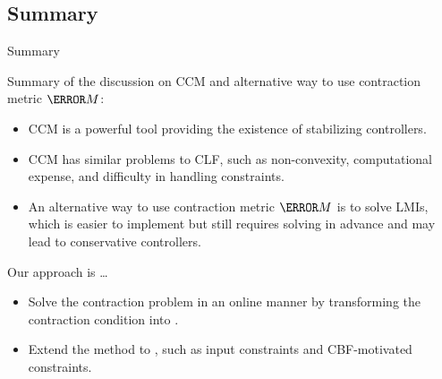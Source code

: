 \subsection{Summary}

\begin{frame}{\insertsubsectionhead}{Summary}

    Summary of the discussion on CCM and alternative way to use contraction metric $\mm{M}$:

    \begin{itemize}
        \item CCM is a powerful tool providing the existence of stabilizing controllers.
        \item CCM has similar problems to CLF, such as non-convexity, computational expense, and difficulty in handling constraints.
        \item An alternative way to use contraction metric $\mm{M}$ is to solve LMIs, which is easier to implement but still requires solving in advance and may lead to conservative controllers.
    \end{itemize}

    \hfill

    Our approach is \dots

    \begin{itemize}
        \item Solve the contraction problem in an online manner by transforming the contraction condition into .
        \item Extend the method to , such as input constraints and CBF-motivated constraints.
    \end{itemize}
    
\end{frame}